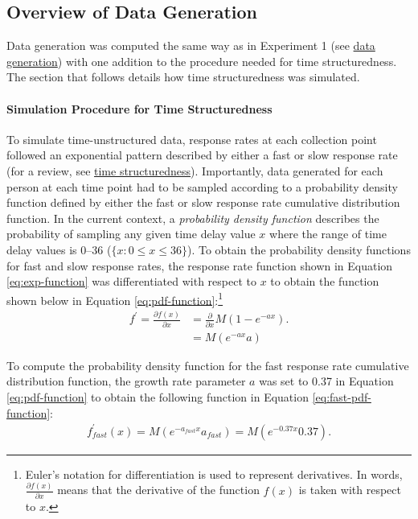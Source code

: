\documentclass[
12pt, %
twoside,
english]{guelphthesis}
\begin{document}
\hypertarget{overview-of-data-generation-1}{%
\subsection{Overview of Data Generation}\label{overview-of-data-generation-1}}

Data generation was computed the same way as in Experiment 1 (see \protect\hyperlink{data-generation}{data generation}) with one addition to the procedure needed for time structuredness. The section that follows details how time structuredness was simulated.

\hypertarget{simulating-time-struc}{%
\paragraph{Simulation Procedure for Time Structuredness}\label{simulating-time-struc}}

To simulate time-unstructured data, response rates at each collection
point followed an exponential pattern described by either a fast or slow
response rate (for a review, see \protect\hyperlink{time-structuredness}{time structuredness}). Importantly, data generated
for each person at each time point had to be sampled according to a
probability density function defined by either the fast or slow response
rate cumulative distribution function. In the current context, a
\emph{probability density function} describes the probability of sampling
any given time delay value \(x\) where the range of time delay values is
0--36 (\(\{x : 0 \le x \le 36 \}\)). To obtain the probability density functions
for fast and slow response rates, the response rate function shown in
Equation \eqref{eq:exp-function} was differentiated with respect to \(x\) to
obtain the function shown below in Equation \ref{eq:pdf-function}:\footnote{Euler's notation for differentiation is used to represent derivatives. In words, $\frac{\partial f(x)}{\partial x}$ means that the derivative of the function $f(x)$ is taken with respect to $x$.}
\begin{align}
f^\prime = \frac{\partial f(x)}{\partial x} &= \frac{\partial}{\partial x}M(1 - e^{-ax}). \nonumber \\
&= M (e^{-ax}a)
\label{eq:pdf-function}
\end {align}

\noindent To compute the probability density function for the fast
response rate cumulative distribution function, the growth rate
parameter \(a\) was set to 0.37 in Equation \ref{eq:pdf-function} to
obtain the following function in Equation \ref{eq:fast-pdf-function}:
\begin{align}
f^\prime_{fast}(x) = M (e^{-a_{fast}x}a_{fast}) = M (e^{-0.37x}0.37). 
\label{eq:fast-pdf-function}
\end {align}
\end{document}
